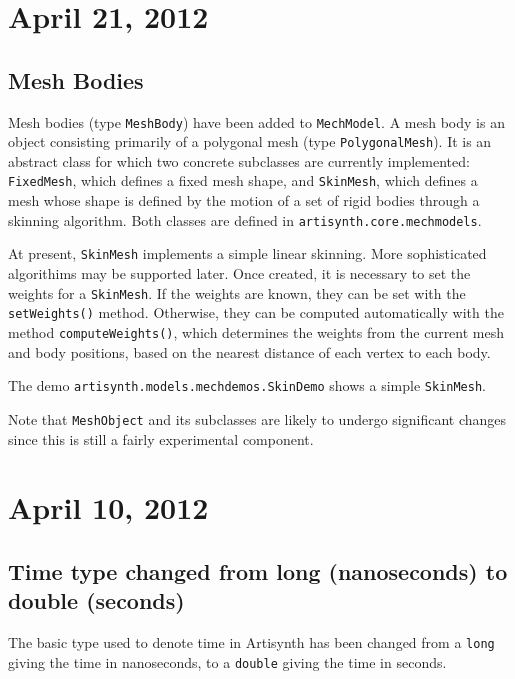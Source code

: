 \documentclass{article}
\begin{document}
\section*{April 21, 2012}

\subsection*{Mesh Bodies}

Mesh bodies (type {\tt MeshBody}) have been added to {\tt MechModel}. A mesh
body is an object consisting primarily of a polygonal mesh (type
{\tt PolygonalMesh}). It is an abstract class for which two concrete
subclasses are currently implemented: {\tt FixedMesh}, which defines a
fixed mesh shape, and {\tt SkinMesh}, which defines a mesh whose shape is
defined by the motion of a set of rigid bodies through a skinning
algorithm. Both classes are defined in {\tt artisynth.core.mechmodels}.

At present, {\tt SkinMesh} implements a simple linear skinning. More
sophisticated algorithims may be supported later. Once created, it is
necessary to set the weights for a {\tt SkinMesh}.  If the weights are
known, they can be set with the {\tt setWeights()} method. Otherwise, they
can be computed automatically with the method {\tt computeWeights()}, which
determines the weights from the current mesh and body positions, based
on the nearest distance of each vertex to each body.

The demo {\tt artisynth.models.mechdemos.SkinDemo} shows a simple
{\tt SkinMesh}.

\begin{sideblock}
Note that {\tt MeshObject} and its subclasses are likely
to undergo significant changes since this is still a fairly
experimental component.
\end{sideblock}

\section*{April 10, 2012}

\subsection*{Time type changed from long (nanoseconds) to double (seconds)}

The basic type used to denote time in Artisynth has been changed from
a {\tt long} giving the time in nanoseconds, to a {\tt double} giving the time
in seconds.
\end{document}
